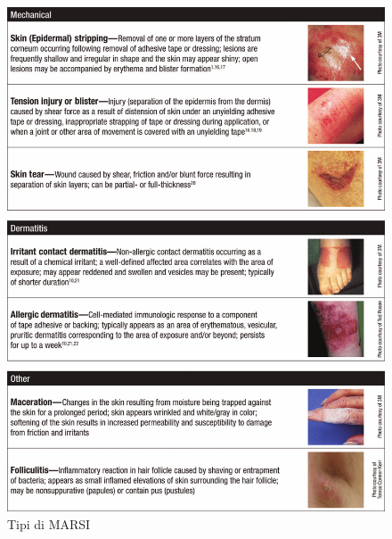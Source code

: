\begin{figure}[H]
    \begin{center}
    \includegraphics[width=0.6\columnwidth]{img/Types-of-adhesive-related-skin-injury.jpg}
    \vspace{-3mm}
    \end{center}
    \caption{Tipi di MARSI
    \cite{img58}}
    \label{fig:FIGURE_4.22}
\end{figure}
